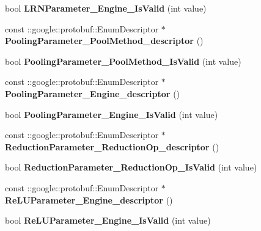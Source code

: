 \begin{DoxyCompactItemize}
\mbox{\label{namespacecaffe_a6de7d6f1fa088f3dabdab56cb92f83f0}} 
bool {\bfseries L\+R\+N\+Parameter\+\_\+\+Engine\+\_\+\+Is\+Valid} (int value)
\item 
\mbox{\label{namespacecaffe_acc4b16d86f3e1b56d63cc5c94e345657}} 
const \+::google\+::protobuf\+::\+Enum\+Descriptor $\ast$ {\bfseries Pooling\+Parameter\+\_\+\+Pool\+Method\+\_\+descriptor} ()
\item 
\mbox{\label{namespacecaffe_abc6a6ea640e1ce17e279b1915f6afda0}} 
bool {\bfseries Pooling\+Parameter\+\_\+\+Pool\+Method\+\_\+\+Is\+Valid} (int value)
\item 
\mbox{\label{namespacecaffe_a2c78da32d7018092906dba4500edb81d}} 
const \+::google\+::protobuf\+::\+Enum\+Descriptor $\ast$ {\bfseries Pooling\+Parameter\+\_\+\+Engine\+\_\+descriptor} ()
\item 
\mbox{\label{namespacecaffe_ad0728653093cffaba906e5fbbfa0bda1}} 
bool {\bfseries Pooling\+Parameter\+\_\+\+Engine\+\_\+\+Is\+Valid} (int value)
\item 
\mbox{\label{namespacecaffe_a076d91d00f48174568e5fe02f0b9b994}} 
const \+::google\+::protobuf\+::\+Enum\+Descriptor $\ast$ {\bfseries Reduction\+Parameter\+\_\+\+Reduction\+Op\+\_\+descriptor} ()
\item 
\mbox{\label{namespacecaffe_ac25ede5a03a1744e1d589e8327f7b9ec}} 
bool {\bfseries Reduction\+Parameter\+\_\+\+Reduction\+Op\+\_\+\+Is\+Valid} (int value)
\item 
\mbox{\label{namespacecaffe_afb9694abe7bf9639a908103177acad57}} 
const \+::google\+::protobuf\+::\+Enum\+Descriptor $\ast$ {\bfseries Re\+L\+U\+Parameter\+\_\+\+Engine\+\_\+descriptor} ()
\item 
\mbox{\label{namespacecaffe_a91a970db9f12916d43d8853da8786f1d}} 
bool {\bfseries Re\+L\+U\+Parameter\+\_\+\+Engine\+\_\+\+Is\+Valid} (int value)
\item 
\mbox{\label{namespacecaffe_a85ec76dbe1381cee3bddb94f8e09ecbb}} 

\end{DoxyCompactItemize}

